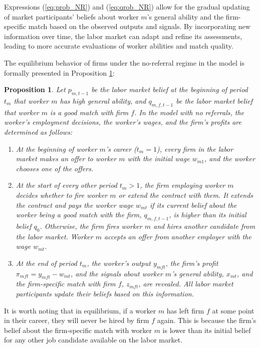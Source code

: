 \documentclass[12pt]{article}
\newtheorem{proposition}{Proposition}
\begin{document}
Expressions (\ref{eq:prob_NR}) and (\ref{eq:qrob_NR}) allow for the gradual updating of market participants' beliefs about worker $m$'s general ability and the firm-specific match based on the observed outputs and signals. By incorporating new information over time, the labor market can adapt and refine its assessments, leading to more accurate evaluations of worker abilities and match quality.

The equilibrium behavior of firms under the no-referral regime in the model is formally presented in Proposition \ref{prop:equil_no_referrals}:

\begin{proposition}\label{prop:equil_no_referrals}
Let $p_{m,t-1}$ be the labor market belief at the beginning of period $t_m$ that worker $m$ has high general ability, and $q_{m,f,t-1}$ be the labor market belief that worker $m$ is a good match with firm $f$. In the model with no referrals, the worker's employment decisions, the worker's wages, and the firm's profits are determined as follows:
    \begin{enumerate}[label={\roman*})]
        \item At the beginning of worker $m$'s career ($t_m = 1$), every firm in the labor market makes an offer to worker $m$ with the initial wage $w_{m1}$, and the worker chooses one of the offers.
        \item At the start of every other period $t_m > 1$, the firm employing worker $m$ decides whether to fire worker $m$ or extend the contract with them. It extends the contract and pays the worker wage $w_{mt}$ if its current belief about the worker being a good match with the firm, $q_{m,f,t-1}$, is higher than its initial belief $q_0$. Otherwise, the firm fires worker $m$ and hires another candidate from the labor market. Worker $m$ accepts an offer from another employer with the wage $w_{mt}$.
        \item At the end of period $t_m$, the worker's output $y_{mft}$, the firm's profit $\pi_{mft} = y_{mft} - w_{mt}$, and the signals about worker $m$'s general ability, $x_{mt}$, and the firm-specific match with firm $f$, $z_{mft}$, are revealed. All labor market participants update their beliefs based on this information.
    \end{enumerate}
\end{proposition}

It is worth noting that in equilibrium, if a worker $m$ has left firm $f$ at some point in their career, they will never be hired by firm $f$ again. This is because the firm's belief about the firm-specific match with worker $m$ is lower than its initial belief for any other job candidate available on the labor market.
\end{document}
